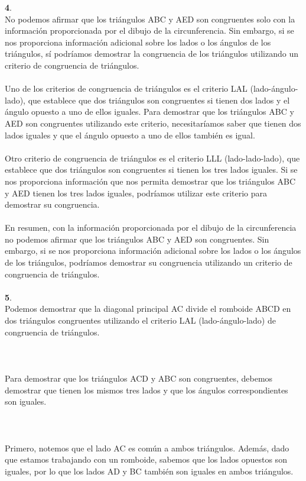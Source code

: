 \documentclass{article}
\begin{document}
{\textbf 4. }\\
No podemos afirmar que los triángulos ABC y AED son congruentes solo con la información proporcionada por el dibujo de la circunferencia. Sin embargo, si se nos proporciona información adicional sobre los lados o los ángulos de los triángulos, sí podríamos demostrar la congruencia de los triángulos utilizando un criterio de congruencia de triángulos.\\
\\
Uno de los criterios de congruencia de triángulos es el criterio LAL (lado-ángulo-lado), que establece que dos triángulos son congruentes si tienen dos lados y el ángulo opuesto a uno de ellos iguales. Para demostrar que los triángulos ABC y AED son congruentes utilizando este criterio, necesitaríamos saber que tienen dos lados iguales y que el ángulo opuesto a uno de ellos también es igual.\\
\\
Otro criterio de congruencia de triángulos es el criterio LLL (lado-lado-lado), que establece que dos triángulos son congruentes si tienen los tres lados iguales. Si se nos proporciona información que nos permita demostrar que los triángulos ABC y AED tienen los tres lados iguales, podríamos utilizar este criterio para demostrar su congruencia.\\
\\
En resumen, con la información proporcionada por el dibujo de la circunferencia no podemos afirmar que los triángulos ABC y AED son congruentes. Sin embargo, si se nos proporciona información adicional sobre los lados o los ángulos de los triángulos, podríamos demostrar su congruencia utilizando un criterio de congruencia de triángulos.\\
\\
{\textbf 5. }\\
Podemos demostrar que la diagonal principal AC divide el romboide ABCD en dos triángulos congruentes utilizando el criterio LAL (lado-ángulo-lado) de congruencia de triángulos.\\\\
\\\\
Para demostrar que los triángulos ACD y ABC son congruentes, debemos demostrar que tienen los mismos tres lados y que los ángulos correspondientes son iguales.\\\\
\\\\
Primero, notemos que el lado AC es común a ambos triángulos. Además, dado que estamos trabajando con un romboide, sabemos que los lados opuestos son iguales, por lo que los lados AD y BC también son iguales en ambos triángulos.\\\\
\end{document}
